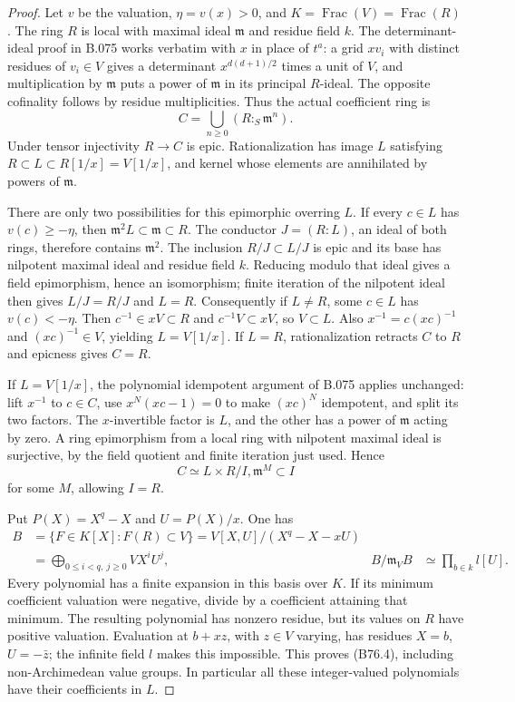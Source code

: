 \begin{proof}
Let $v$ be the valuation, $\eta=v(x)>0$, and $K=\operatorname{Frac}(V)
=\operatorname{Frac}(R)$. The ring $R$ is local with maximal ideal
$\mathfrak m$ and residue field $k$. The determinant-ideal proof in
B.075 works verbatim with $x$ in place of $t^a$: a grid $xv_i$ with
distinct residues of $v_i\in V$ gives a determinant $x^{d(d+1)/2}$ times
a unit of $V$, and multiplication by $\mathfrak m$ puts a power of
$\mathfrak m$ in its principal $R$-ideal. The opposite cofinality follows
by residue multiplicities. Thus the actual coefficient ring is
\[
                 C=\bigcup_{n\ge0}(R:_S\mathfrak m^n).    \tag{B76.2}
\]
Under tensor injectivity $R\to C$ is epic. Rationalization has image
$L$ satisfying $R\subset L\subset R[1/x]=V[1/x]$, and kernel whose
elements are annihilated by powers of $\mathfrak m$.

There are only two possibilities for this epimorphic overring $L$.
If every $c\in L$ has $v(c)\ge-\eta$, then
$\mathfrak m^2L\subset\mathfrak m\subset R$.
The conductor $J=(R:L)$, an ideal of both rings, therefore contains
$\mathfrak m^2$. The inclusion $R/J\subset L/J$ is epic and its base
has nilpotent maximal ideal and residue field $k$. Reducing modulo
that ideal gives a field epimorphism, hence an isomorphism; finite
iteration of the nilpotent ideal then gives $L/J=R/J$ and $L=R$.
Consequently if $L\ne R$, some $c\in L$ has $v(c)<-\eta$.
Then $c^{-1}\in xV\subset R$ and $c^{-1}V\subset xV$, so $V\subset L$.
Also $x^{-1}=c(xc)^{-1}$ and $(xc)^{-1}\in V$, yielding $L=V[1/x]$.
If $L=R$, rationalization retracts $C$ to $R$ and epicness gives $C=R$.

If $L=V[1/x]$, the polynomial idempotent argument of B.075 applies
unchanged: lift $x^{-1}$ to $c\in C$, use
$x^N(xc-1)=0$ to make $(xc)^N$ idempotent, and split its two factors.
The $x$-invertible factor is $L$, and the other has a power of
$\mathfrak m$ acting by zero. A ring epimorphism from a local ring
with nilpotent maximal ideal is surjective, by the field quotient
and finite iteration just used. Hence
\[
                    C\simeq L\times R/I,
                    \mathfrak m^M\subset I               \tag{B76.3}
\]
for some $M$, allowing $I=R$.

Put $P(X)=X^q-X$ and $U=P(X)/x$. One has
\[
 \begin{aligned}
 B&=\{F\in K[X]:F(R)\subset V\}=V[X,U]/(X^q-X-xU)\\
  &=\bigoplus_{0\le i<q,\ j\ge0}VX^iU^j,
 & B/\mathfrak m_VB&\simeq\prod_{b\in k}l[U].
 \end{aligned}                                      \tag{B76.4}
\]
Every polynomial has a finite expansion in this basis over $K$.
If its minimum coefficient valuation were negative, divide by a
coefficient attaining that minimum. The resulting polynomial has
nonzero residue, but its values on $R$ have positive valuation.
Evaluation at $b+xz$, with $z\in V$ varying, has residues
$X=b$, $U=-\bar z$; the infinite field $l$ makes this impossible.
This proves (B76.4), including non-Archimedean value groups.
In particular all these integer-valued polynomials have their
coefficients in $L$.


\end{proof}
